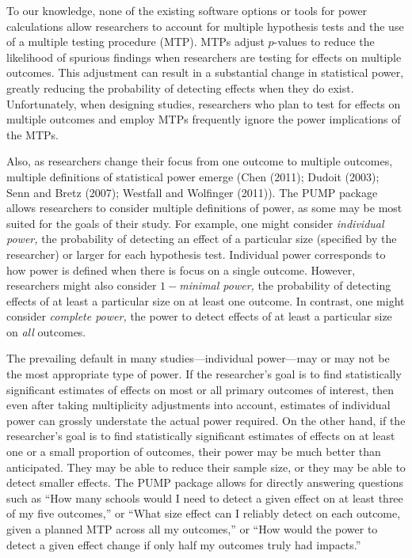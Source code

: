 \documentclass[
]{article}
\begin{document}
To our knowledge, none of the existing software options or tools for
power calculations allow researchers to account for multiple hypothesis
tests and the use of a multiple testing procedure (MTP). MTPs adjust
\(p\)-values to reduce the likelihood of spurious findings when
researchers are testing for effects on multiple outcomes. This
adjustment can result in a substantial change in statistical power,
greatly reducing the probability of detecting effects when they do
exist. Unfortunately, when designing studies, researchers who plan to
test for effects on multiple outcomes and employ MTPs frequently ignore
the power implications of the MTPs.

Also, as researchers change their focus from one outcome to multiple
outcomes, multiple definitions of statistical power emerge (Chen (2011);
Dudoit (2003); Senn and Bretz (2007); Westfall and Wolfinger (2011)).
The PUMP package allows researchers to consider multiple definitions of
power, as some may be most suited for the goals of their study. For
example, one might consider \emph{individual power,} the probability of
detecting an effect of a particular size (specified by the researcher)
or larger for each hypothesis test. Individual power corresponds to how
power is defined when there is focus on a single outcome. However,
researchers might also consider \emph{\(1-\)minimal power,} the
probability of detecting effects of at least a particular size on at
least one outcome. In contrast, one might consider \emph{complete
power,} the power to detect effects of at least a particular size on
\emph{all} outcomes.

The prevailing default in many studies---individual power---may or may
not be the most appropriate type of power. If the researcher's goal is
to find statistically significant estimates of effects on most or all
primary outcomes of interest, then even after taking multiplicity
adjustments into account, estimates of individual power can grossly
understate the actual power required. On the other hand, if the
researcher's goal is to find statistically significant estimates of
effects on at least one or a small proportion of outcomes, their power
may be much better than anticipated. They may be able to reduce their
sample size, or they may be able to detect smaller effects. The PUMP
package allows for directly answering questions such as ``How many
schools would I need to detect a given effect on at least three of my
five outcomes,'' or ``What size effect can I reliably detect on each
outcome, given a planned MTP across all my outcomes,'' or ``How would
the power to detect a given effect change if only half my outcomes truly
had impacts.''
\end{document}

